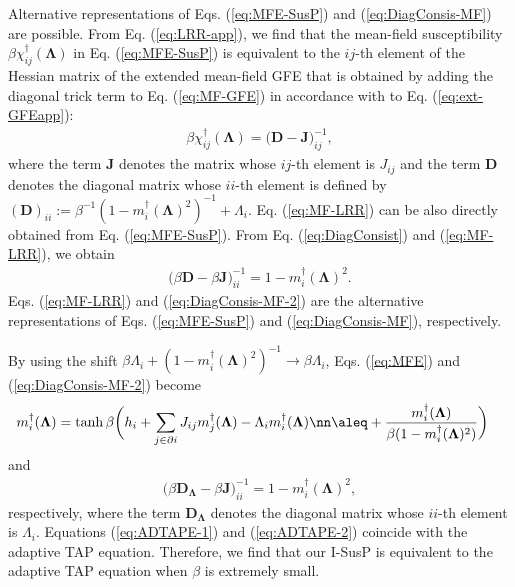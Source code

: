 \documentclass[%
 reprint,
 amsmath,amssymb,
 aps, 
 pre,
 showkeys
]{revtex4-1}
\begin{document}
Alternative representations of Eqs. (\ref{eq:MFE-SusP}) and (\ref{eq:DiagConsis-MF}) are possible. 
From Eq. (\ref{eq:LRR-app}), we find that the mean-field susceptibility $\beta \chi_{ij}^{\dagger}(\bm{\Lambda})$ in Eq. (\ref{eq:MFE-SusP})
is equivalent to the $ij$-th element of the Hessian matrix of the extended mean-field GFE that is obtained by adding the diagonal trick term to Eq. (\ref{eq:MF-GFE}) 
in accordance with to Eq. (\ref{eq:ext-GFEapp}):
\begin{align}
\beta \chi_{ij}^{\dagger}(\bm{\Lambda}) = \big( \bm{D} - \bm{J} \big)^{-1}_{ij}, 
\label{eq:MF-LRR}
\end{align}
where the term $\bm{J}$ denotes the matrix whose $ij$-th element is $J_{ij}$ and the term $\bm{D}$ denotes the diagonal matrix whose $ii$-th element is defined by 
$(\bm{D})_{ii}:= \beta^{-1}(1 - m_i^{\dagger}(\bm{\Lambda})^2)^{-1} + \Lambda_i$. 
Eq. (\ref{eq:MF-LRR}) can be also directly obtained from Eq. (\ref{eq:MFE-SusP}).
From Eq. (\ref{eq:DiagConsist}) and (\ref{eq:MF-LRR}), we obtain 
\begin{align}
\big( \beta \bm{D} - \beta \bm{J} \big)^{-1}_{ii} = 1 - m_i^{\dagger}(\bm{\Lambda})^2. 
\label{eq:DiagConsis-MF-2}
\end{align}
Eqs. (\ref{eq:MF-LRR}) and (\ref{eq:DiagConsis-MF-2}) are the alternative representations of Eqs. (\ref{eq:MFE-SusP}) and (\ref{eq:DiagConsis-MF}), respectively. 

By using the shift $\beta \Lambda_i  + (1 - m_i^{\dagger}(\bm{\Lambda})^2)^{-1} \rightarrow \beta \Lambda_i$, 
Eqs. (\ref{eq:MFE}) and (\ref{eq:DiagConsis-MF-2}) become
\begin{align}
m_i^{\dagger}(\bm{\Lambda})&=\tanh \beta \bigg( h_i + \sum_{j \in \partial i}J_{ij}m_j^{\dagger}(\bm{\Lambda}) - \Lambda_i m_i^{\dagger}(\bm{\Lambda})  \nn
\aleq
+ \frac{m_i^{\dagger}(\bm{\Lambda})}{\beta( 1 - m_i^{\dagger}(\bm{\Lambda})^2 )}\bigg)
\label{eq:ADTAPE-1}
\end{align}
and 
\begin{align}
\big( \beta \bm{D}_{\bm{\Lambda}} - \beta \bm{J} \big)^{-1}_{ii} = 1 - m_i^{\dagger}(\bm{\Lambda})^2, 
\label{eq:ADTAPE-2}
\end{align}
respectively, where the term $\bm{D}_{\bm{\Lambda}}$ denotes the diagonal matrix whose $ii$-th element is $\Lambda_i$.
Equations (\ref{eq:ADTAPE-1}) and (\ref{eq:ADTAPE-2}) coincide with the adaptive TAP equation. 
Therefore, we find that our I-SusP is equivalent to the adaptive TAP equation when $\beta$ is extremely small.
\end{document}
